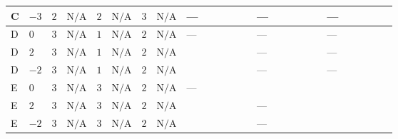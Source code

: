 \documentclass[8pt]{article}
\begin{document}
\begin{landscape}
\begin{longtable}{@{}llcccccc >{\raggedright\arraybackslash}p{0.21\linewidth} >{\raggedright\arraybackslash}p{0.21\linewidth} >{\raggedright\arraybackslash}p{0.21\linewidth}@{}}
\midrule
C & $-3$ & $2$ & $\text{N/A}$ & $2$ & $\text{N/A}$ & $3$ & $\text{N/A}$ & --- & --- & --- \\
\midrule
D & $0$ & $3$ & $\text{N/A}$ & $1$ & $\text{N/A}$ & $2$ & $\text{N/A}$ & --- & --- & --- \\
\midrule
D & $2$ & $3$ & $\text{N/A}$ & $1$ & $\text{N/A}$ & $2$ & $\text{N/A}$ & \scriptsize\adjustbox{max width=\linewidth}{$\begin{gathered} +{g_1}^2 \left(8 {g_2}^2-12 {\lambda_{S_1}^{(A)}}\right)\end{gathered}$} & --- & --- \\
\midrule
D & $-2$ & $3$ & $\text{N/A}$ & $1$ & $\text{N/A}$ & $2$ & $\text{N/A}$ & \scriptsize\adjustbox{max width=\linewidth}{$\begin{gathered} +{g_1}^2 \left(8 {g_2}^2-12 {\lambda_{S_1}^{(A)}}\right)\end{gathered}$} & --- & --- \\
\midrule
E & $0$ & $3$ & $\text{N/A}$ & $3$ & $\text{N/A}$ & $2$ & $\text{N/A}$ & --- & \scriptsize\adjustbox{max width=\linewidth}{$\begin{gathered} -\frac{4}{3} {\lambda_{X_{5}}^{(1)}} (3 \left({\lambda_{X_{5}}^{(1)}}\right)^{*}+\left({\lambda_{X_{5}}^{(2)}}\right)^{*})\end{gathered}$} & \scriptsize\adjustbox{max width=\linewidth}{$\begin{gathered} +12 {\lambda_{12}^{(A)}}^2\end{gathered}$} \\
\midrule
E & $2$ & $3$ & $\text{N/A}$ & $3$ & $\text{N/A}$ & $2$ & $\text{N/A}$ & \scriptsize\adjustbox{max width=\linewidth}{$\begin{gathered} +{g_1}^2 \left(8 {g_2}^2-12 {\lambda_{S_1}^{(A)}}\right)\end{gathered}$} & --- & \scriptsize\adjustbox{max width=\linewidth}{$\begin{gathered} +12 {\lambda_{12}^{(A)}}^2\end{gathered}$} \\
\midrule
E & $-2$ & $3$ & $\text{N/A}$ & $3$ & $\text{N/A}$ & $2$ & $\text{N/A}$ & \scriptsize\adjustbox{max width=\linewidth}{$\begin{gathered} +{g_1}^2 \left(8 {g_2}^2-12 {\lambda_{S_1}^{(A)}}\right)\end{gathered}$} & --- & \scriptsize\adjustbox{max width=\linewidth}{$\begin{gathered} +12 {\lambda_{12}^{(A)}}^2\end{gathered}$} \\

\end{longtable}
\end{landscape}
\end{document}

